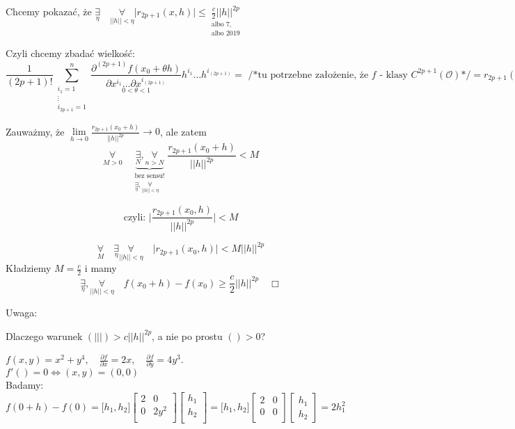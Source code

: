 \documentclass[../main.tex]{subfiles}
\begin{document}
Chcemy pokazać, że $\underset{\eta}{\exists} \quad \underset{||h||<\eta}{\forall} \Big | r_{2p+1} (x,h) \Big | \leq \underset{\substack{\text{albo 7,}\\ \text{albo 2019}}}{\frac{c}{2} ||h||^{2p}}$

Czyli chcemy zbadać wielkość:
$$ \frac{1}{(2p+1)!} \sum_{\substack{i_1 = 1 \\ \vdots \\ i_{2p+1} = 1}}^n \underset{0 < \theta < 1}{\frac{\partial^{(2p+1)} f (x_0 + \theta h)}{\partial x^{i_1} \dots \partial x^{i_{(2p+1)}}}} h^{i_1} \dots h^{i_{(2p+1)}} = \text{ /*tu potrzebne założenie, że } f \text { - klasy } C^{2p+1} (\mathcal{O})\text{*/} = r_{2p+1} (x,h)$$

Zauważmy, że $\lim\limits_{h \to 0} \frac{r_{2p+1}(x_0+h)}{||h||^{2p}} \to 0$, ale zatem
$$\underset{M>0}{\forall}\quad \underbrace{\underset{N}{\exists},\underset{n>N}{\forall}}_{\substack{\text{bez sensu!}\\
\underset{\eta}{\exists},\underset{||h|| < \eta}{\forall}}} \frac{r_{2p+1}(x_0+h)}{||h||^{2p}} < M$$

$$\text{czyli: } \Bigg | \frac{r_{2p+1} (x_0,h)}{||h||^{2p}} \Bigg | < M$$

$$\underset{M}{\forall}\quad \underset{\eta}{\exists} \underset{||h|| < \eta}{\forall}\quad \Big | r_{2p+1} (x_0,h) \Big | < M \big | \big |h \big | \big |^{2p}$$
Kładziemy $M = \frac{c}{2}$ i mamy
$$\underset{\eta}{\exists},\underset{||h||<\eta}{\forall}\quad f(x_0+h)-f(x_0) \geq \frac{c}{2} ||h||^{2p} \quad \Box $$

\begin{large}
    Uwaga:
\end{large}
Dlaczego warunek $( | \big | | ) > c ||h||^{2p}$, a nie po prostu $( ) > 0$?

\begin{przyklad}

\end{przyklad}
$f(x,y) = x^2 + y^4,\quad \frac{\partial f}{\partial x} = 2x,\quad \frac{\partial f}{\partial y} = 4y^3$.\\
$f'() = 0 \iff (x,y) = (0,0)$\\
Badamy: $f(0+h) - f(0) = \big [ h_1, h_2 \big ] \left [ \begin{matrix}
2 &0\\
0 &2y^2\\
\end{matrix}\right ]
\left [ \begin{matrix}
h_1\\
h_2\\\end{matrix}\right ]
= \big [ h_1, h_2 \big ] \left [ \begin{matrix}
2 &0\\
0 &0\\ \end{matrix}\right ]
\left [ \begin{matrix} h_1\\
h_2\end{matrix}\right ] = 2h_1^2$
\end{document}
